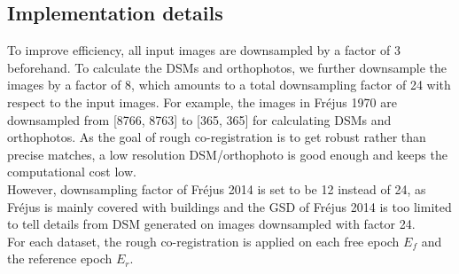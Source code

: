 \subsection{Implementation details}
To improve efficiency, all input images are downsampled by a factor of 3 beforehand. To calculate the DSMs and orthophotos, we further downsample the images by a factor of 8, which amounts to a total downsampling factor of 24 with respect to the input images. For example, the images in Fr{\'e}jus 1970 are downsampled from [8766, 8763] to [365, 365] for calculating DSMs and orthophotos. As the goal of rough co-registration is to get robust rather than precise matches, a low resolution DSM/orthophoto is good enough and keeps the computational cost low. \\
However, downsampling factor of Fr{\'e}jus 2014 is set to be 12 instead of 24, as Fr{\'e}jus is mainly covered with buildings and the GSD of Fr{\'e}jus 2014 is too limited to tell details from DSM generated on images downsampled with factor 24.\\
For each dataset, the rough co-registration is applied on each free epoch $E_f$ and the reference epoch $E_r$.
\par

